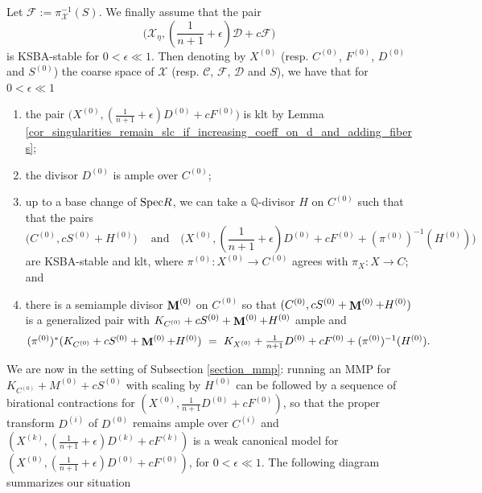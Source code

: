 \documentclass[a4paper,12pt]{amsart}
\newcommand{\sF}{\mathscr{F}}
\newcommand{\bQ}{{\mathbb Q}}
\newcommand{\sD}{{\mathscr{D}}}
\newcommand{\sX}{{\mathscr{X}}}
\newcommand{\sC}{{\mathscr{C}}}
\DeclareMathOperator{\bfM}{{\bf{M}}}
\newcommand\spec{\text{\rm Spec}}
\theoremstyle{definition}
\theoremstyle{remark}
\begin{document}
 Let $\sF:=\pi^{-1}_\sX(S)$. We finally assume that the pair $$\textstyle \big(\sX_\eta,(\frac{1}{n+1}+\epsilon)\sD + c\sF\big)$$ is KSBA-stable for $0<\epsilon\ll1$. Then denoting by $X^{(0)}$ (resp. $C^{(0)}$, $F^{(0)}$, $D^{(0)}$ and $S^{(0)}$) the coarse space of $\sX$ (resp. $\sC$, $\sF$, $\sD$ and $S$), we have that for $0<\epsilon \ll 1$  \begin{enumerate}
        \item the pair $\big(X^{(0)},(\frac{1}{n+1}+\epsilon)D^{(0)}+cF^{(0)}\big)$ is klt by Lemma \ref{cor_singularities_remain_slc_if_increasing_coeff_on_d_and_adding_fibers};
        \item the divisor $D^{(0)}$ is ample over $C^{(0)}$;
        \item up to a base change of $\spec R $, we can take a $\bQ$-divisor $H$ on $C^{(0)}$ such that that the pairs \[\textstyle \big(C^{(0)},c S^{(0)} + H^{(0)}\big) \  \ \ \ \text{ and } \ \ \ \big(X^{(0)},(\frac{1}{n+1}+\epsilon)D^{(0)}+cF^{(0)} + (\pi^{(0)})^{-1}(H^{(0)})\big)\] are KSBA-stable and klt, where $\pi^{(0)}:X^{(0)}\rightarrow C^{(0)}$ agrees with $\pi_X:X\rightarrow C$; and
        \item there is a semiample divisor $\bfM^{(0)}$ on $C^{(0)}$ so that $(C^{(0)},cS^{(0)}+\bfM^{(0)} + H^{(0)})$ is a generalized pair with $K_{C^{(0)}}+c S^{(0)}+\bfM^{(0)} + H^{(0)}$ ample and \[\textstyle (\pi^{(0)})^*(K_{C^{(0)}}+cS^{(0)}+\bfM^{(0)} + H^{(0)}) \  = \ K_{X^{(0)}}+\frac{1}{n+1}D^{(0)}+cF^{(0)} + (\pi^{(0)})^{-1}(H^{(0)}).\] 
    \end{enumerate}
    We are now in the setting of Subsection \ref{section_mmp}: running an MMP for $K_{C^{(0)}}+M^{(0)}+c S^{(0)}$ with scaling by $H^{(0)}$ can be followed by a sequence of birational contractions
    for $(X^{(0)},\frac{1}{n+1}D^{(0)}+cF^{(0)})$, so that the proper transform $D^{(i)}$ of $D^{(0)}$
    remains ample over $C^{(i)}$ and $(X^{(k)},(\frac{1}{n+1}+\epsilon)D^{(k)}+cF^{(k)})$ is a weak canonical model for $(X^{(0)},(\frac{1}{n+1}+\epsilon)D^{(0)}+cF^{(0)})$, for $0<\epsilon \ll 1$. The following diagram summarizes our situation
\end{document}

